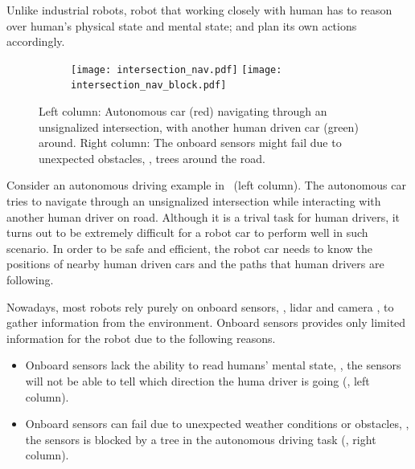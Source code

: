 \documentclass{article}
\begin{document}
Unlike industrial robots,
robot that working closely with human has to 
reason over human's 
physical state and mental state;
and plan its own actions accordingly.

\begin{figure}[!h]
    \centering
    \begin{subfigure}{1.0\linewidth}
        \centering
        \texttt{[image: intersection\_nav.pdf]}
        \hspace{1.5cm}
        \texttt{[image: intersection\_nav\_block.pdf]}
    \end{subfigure}
    \caption{Left column:
        Autonomous car (red) navigating through an unsignalized 
        intersection, with another human driven car (green) around. 
        Right column:
        The onboard sensors might fail due to unexpected obstacles,
        \eg, trees around the road.
    }
    \label{fig:intersection_nav}
\end{figure}


Consider an autonomous driving example in~ (left column).
The autonomous car tries to navigate through an unsignalized intersection
while interacting with another human driver on road. 
Although it is a trival task for human drivers, it
turns out to be extremely difficult for a robot car to perform 
well in such scenario. 
In order to be safe and efficient, 
the robot car needs to 
know the positions of nearby human driven cars and the paths that 
human drivers are following.


Nowadays, most robots rely purely on onboard sensors,
\eg, lidar and camera \etc,
to gather information from the environment. 
Onboard sensors provides only limited information for the
robot due to the following reasons.
\begin{itemize}
    \item Onboard sensors lack the ability to read humans' mental 
        state, \eg, the sensors will not be able to tell 
        which direction the huma driver is going
        (, left column).
    \item Onboard sensors can fail due to unexpected weather
        conditions or obstacles, \eg, the sensors is blocked
        by a tree in the autonomous driving task
        (, right column).
\end{itemize}
\end{document}
